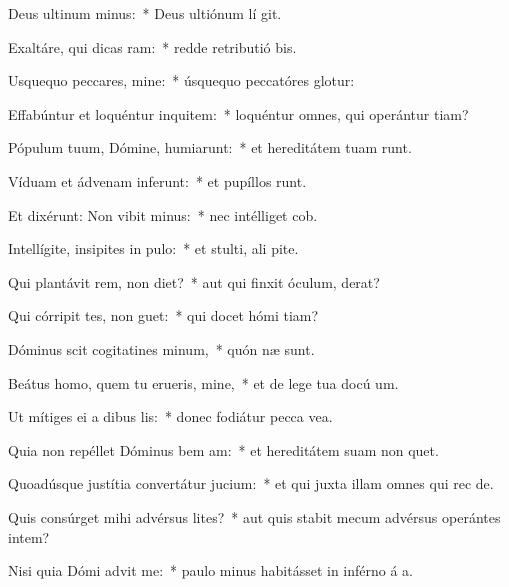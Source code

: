 \item Deus ultinum minus:~* Deus ultiónum lí git.
\item Exaltáre, qui dicas ram:~* redde retributió bis.
\item Usquequo peccares, mine:~* úsquequo peccatóres glotur:
\item Effabúntur et loquéntur inquitem:~* loquéntur omnes, qui operántur tiam?
\item Pópulum tuum, Dómine, humiarunt:~* et hereditátem tuam runt.
\item Víduam et ádvenam inferunt:~* et pupíllos runt.
\item Et dixérunt: Non vibit minus:~* nec intélliget  cob.
\item Intellígite, insipites in pulo:~* et stulti, ali pite.
\item Qui plantávit rem, non diet?~* aut qui finxit óculum,  derat?
\item Qui córripit tes, non guet:~* qui docet hómi tiam?
\item Dóminus scit cogitatines minum,~* quón næ sunt.
\item Beátus homo, quem tu erueris, mine,~* et de lege tua docú um.
\item Ut mítiges ei a dibus lis:~* donec fodiátur pecca vea.
\item Quia non repéllet Dóminus bem am:~* et hereditátem suam non quet.
\item Quoadúsque justítia convertátur  jucium:~* et qui juxta illam omnes qui rec  de.
\item Quis consúrget mihi advérsus lites?~* aut quis stabit mecum advérsus operántes intem?
\item Nisi quia Dómi advit me:~* paulo minus habitásset in inférno á a.

